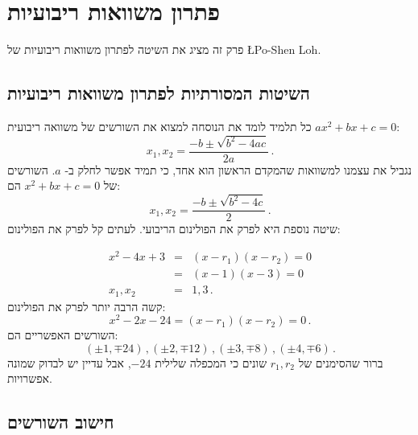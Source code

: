 



\chapter{פתרון משוואות ריבועיות}\label{c.quadratic}

פרק זה מציג את השיטה לפתרון משוואות ריבועיות של 
\L{Po-Shen Loh}.



\section{השיטות המסורתיות לפתרון משוואות ריבועיות}\label{s.traditional}

כל תלמיד לומד את הנוסחה למצוא את השורשים של משוואה ריבועית
$ax^2+bx+c=0$:
\[
x_1, x_2 = \frac{-b\pm\sqrt{b^2-4ac}}{2a}\,.
\]
נגביל את עצמנו למשוואות שהמקדם הראשון הוא אחד, כי תמיד אפשר לחלק ב-%
$a$.
השורשים של
$x^2+bx+c=0$
הם:
\[
x_1, x_2 = \frac{-b\pm\sqrt{b^2-4c}}{2}\,.
\]
שיטה נוספת היא לפרק את הפולינום הריבועי. לעתים קל לפרק את הפולינום:

\begin{eqnarray*}
x^2-4x+3& =& (x-r_1)(x-r_2)=0\\
& =& (x-1)(x-3)=0\\
x_1,x_2&=&1, 3\,.
\end{eqnarray*}
קשה הרבה יותר לפרק את הפולינום:
\[
x^2-2x-24= (x-r_1)(x-r_2)=0\,.
\]
השורשים האפשריים הם:
\[
(\pm 1,\mp 24)\,, (\pm 2,\mp 12)\,, (\pm 3,\mp 8)\,, (\pm 4,\mp 6)\,.
\]
ברור שהסימנים של
$r_1,r_2$
שונים כי המכפלה שלילית
$-24$,
אבל עדיין יש לבדוק שמונה אפשרויות.



\section{חישוב השורשים}\label{s.computing}


